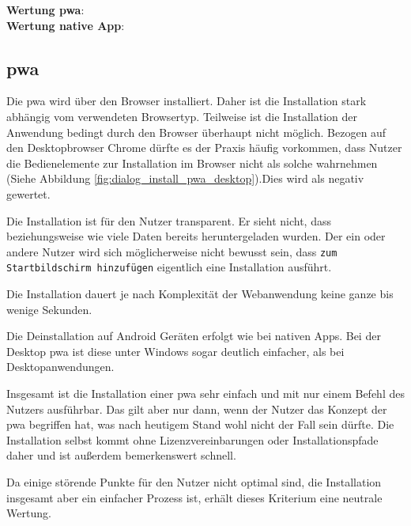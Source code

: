 \textbf{Wertung \ac{pwa}}: \Circle \\
\textbf{Wertung native App}:  \\

\subsection{\ac{pwa}}
Die \ac{pwa} wird über den Browser installiert. Daher ist die Installation stark abhängig vom verwendeten Browsertyp. Teilweise ist die Installation der Anwendung bedingt durch den Browser überhaupt nicht möglich. Bezogen auf den Desktopbrowser Chrome dürfte es der Praxis häufig vorkommen, dass Nutzer die Bedienelemente zur Installation im Browser nicht als solche wahrnehmen (Siehe Abbildung \ref{fig:dialog_install_pwa_desktop}).Dies wird als negativ gewertet.

Die Installation ist für den Nutzer transparent. Er sieht nicht, dass beziehungsweise wie viele Daten bereits heruntergeladen wurden. Der ein oder andere Nutzer wird sich möglicherweise nicht bewusst sein, dass \texttt{zum Startbildschirm hinzufügen} eigentlich eine Installation ausführt.

Die Installation dauert je nach Komplexität der Webanwendung keine ganze bis wenige Sekunden.

Die Deinstallation auf Android Geräten erfolgt wie bei nativen Apps. Bei der Desktop \ac{pwa} ist diese unter Windows sogar deutlich einfacher, als bei Desktopanwendungen.

Insgesamt ist die Installation einer \ac{pwa} sehr einfach und mit nur einem Befehl des Nutzers ausführbar. Das gilt aber nur dann, wenn der Nutzer das Konzept der \ac{pwa} begriffen hat, was nach heutigem Stand wohl nicht der Fall sein dürfte. Die Installation selbst kommt ohne Lizenzvereinbarungen oder Installationspfade daher und ist außerdem bemerkenswert schnell.

Da einige störende Punkte für den Nutzer nicht optimal sind, die Installation insgesamt aber ein einfacher Prozess ist, erhält dieses Kriterium eine neutrale Wertung.
